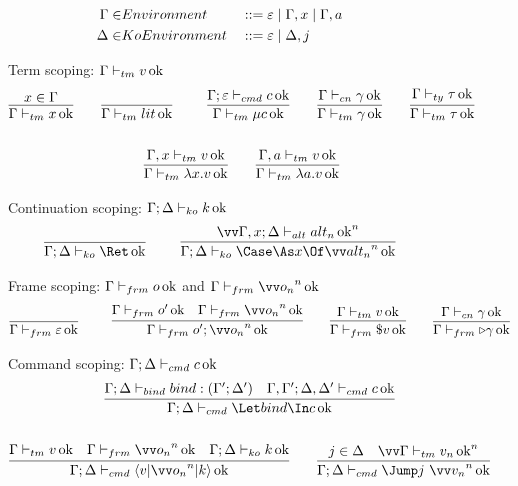 \documentclass{article}
\begin{document}
\begin{figure}
\centering
\begin{gather*}
\begin{aligned}
  \Gamma \in& Environment
  &
  &::= \varepsilon
  \mid \Gamma, x
  \mid \Gamma, a
  \\
  \Delta \in& KoEnvironment
  &
  &::= \varepsilon
  \mid \Delta, j
\end{aligned}
\end{gather*}

Term scoping: $\Gamma \vdash_{tm} v \operatorname{ok}$
\begin{gather*}
  \infer
  {\scopetm{\Gamma}{x}}
  {x \in \Gamma}
  \qquad
  \axiom{\scopetm{\Gamma}{\lit}}
  \qquad
  \infer
  {\scopetm{\Gamma}{\compute q \cmd}}
  {\scopecmd{\Gamma}{\mt}{\cmd}}
  \qquad
  \infer
  {\scopetm{\Gamma}{\cn}}
  {\scopecn{\Gamma}{\cn}}
  \qquad
  \infer
  {\scopetm{\Gamma}{\ty}}
  {\scopety{\Gamma}{\ty}}
  \\\\
  \infer
  {\scopetm{\Gamma}{\fn x \tm}}
  {\scopetm{\Gamma, x}{\tm}}
  \qquad
  \infer
  {\scopetm{\Gamma}{\fn a \tm}}
  {\scopetm{\Gamma, a}{\tm}}
\end{gather*}

Continuation scoping: $\Gamma; \Delta \vdash_{ko} k \operatorname{ok}$
\begin{gather*}
  \axiom
  {\scopeko{\Gamma}{\Delta}{\ret q}}
  \qquad
  \infer
  {\scopeko{\Gamma}{\Delta}{\caseas{x}{\vect[n]{\analt_n}}}}
  {
    \vect[n]{
      \scopealt{\Gamma, x}{\Delta}{\analt_n}
    }
  }
\end{gather*}

Frame scoping: $\Gamma \vdash_{frm} o \operatorname{ok}$ and
$\scopefrm{\Gamma}{\vect[n]{\frm_n}}$
\begin{gather*}
  \axiom{\scopefrm{\Gamma}{\mt}}
  \qquad
  \infer
  {\scopefrm{\Gamma}{\frm' \then \vect[n]{\frm_n}}}
  {
    \scopefrm{\Gamma}{\frm'}
    &
    \scopefrm{\Gamma}{\vect[n]{\frm_n}}
  }
  \qquad
  \infer
  {\scopefrm{\Gamma}{\appto{\tm}}}
  {\scopetm{\Gamma}{\tm}}
  \qquad
  \infer
  {\scopefrm{\Gamma}{\castby{\cn}}}
  {\scopecn{\Gamma}{\cn}}
\end{gather*}

Command scoping: $\Gamma; \Delta \vdash_{cmd} c \operatorname{ok}$
\begin{gather*}
  \infer
  {\scopecmd{\Gamma}{\Delta}{\Let \abind \In \cmd}}
  {
    \scopebind{\Gamma}{\Delta}{\abind}{\Gamma'}{\Delta'}
    &
    \scopecmd{\Gamma,\Gamma'}{\Delta,\Delta'}{\cmd}
  }
  \\\\
  \infer
  {\scopecmd{\Gamma}{\Delta}{\braket{\tm | \vect[n]{\frm_n} | \ko}}}
  {
    \scopetm{\Gamma}{\tm}
    &
    \scopefrm{\Gamma}{\vect[n]{\frm_n}}
    &
    \scopeko{\Gamma}{\Delta}{\ko}
  }
  \qquad
  \infer
  {\scopecmd{\Gamma}{\Delta}{\jump{\vect[n]{\tm_n}}{j}}}
  {
    j \in \Delta
    &
    \vect[n]{
      \scopetm{\Gamma}{\tm_n}
    }
  }
\end{gather*}



\end{figure}
\end{document}

